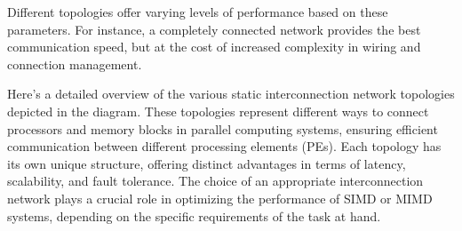 \documentclass[a4paper, 10pt]{book}
\begin{document}
                    Different topologies offer varying levels of performance based on these parameters. For instance, a completely connected network provides the best communication speed, but at the cost of increased complexity in wiring and connection management.

                    \begin{center}
                        
                    \end{center}

                    Here's a detailed overview of the various static interconnection network topologies depicted in the diagram. These topologies represent different ways to connect processors and memory blocks in parallel computing systems, ensuring efficient communication between different processing elements (PEs). Each topology has its own unique structure, offering distinct advantages in terms of latency, scalability, and fault tolerance. The choice of an appropriate interconnection network plays a crucial role in optimizing the performance of SIMD or MIMD systems, depending on the specific requirements of the task at hand.
\end{document}
